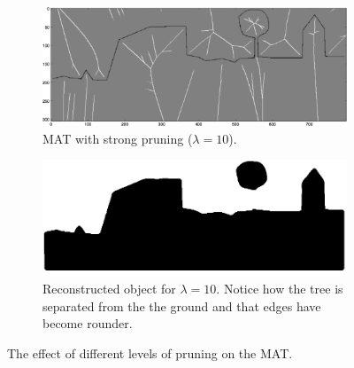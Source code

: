 \begin{figure}
	\begin{subfigure}{0.4\linewidth}
	\includegraphics[width=\linewidth]{figs/rasterimpl/simple_dtm-gamma10_earthskel_.png}
	\caption{MAT with strong pruning ($\lambda=10$).}
	\label{fig:imaimp:e}
	\end{subfigure}
	\quad
	\begin{subfigure}{0.4\linewidth}
	\includegraphics[width=\linewidth]{figs/rasterimpl/simple_dtm-gamma10_earthskel.png}
	\caption{Reconstructed object for $\lambda=10$. Notice how the tree is separated from the the ground and that edges have become rounder.}
	\label{fig:imaimp:f}
	\end{subfigure}
	\caption{The effect of different levels of pruning on the MAT.}
	\label{fig:imaimp}
	\end{figure}


